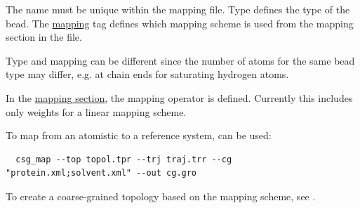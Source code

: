 The name must be unique within the mapping file. Type defines the type of the bead. The \hyperlink{\mapref{topology.cg_beads.cg_bead.mapping}}{mapping} tag defines which mapping scheme is used from the mapping section in the file.

Type and mapping can be different since the number of atoms for the same bead type may differ, e.g. at chain ends for saturating hydrogen atoms.

In the \hyperlink{\mapref{topology.cg_beads.cg_bead.mapping}}{mapping section}, the mapping operator is defined. Currently this includes only weights for a linear mapping scheme.

To map from an atomistic to a reference system,  can be used:
\begin{verbatim}
  csg_map --top topol.tpr --trj traj.trr --cg "protein.xml;solvent.xml" --out cg.gro
\end{verbatim}

To create a coarse-grained topology based on the mapping scheme, see .
